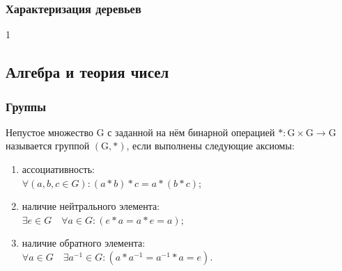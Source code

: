 \documentclass[12pt]{matmex-diploma}
\begin{document}
        \subsubsection*{Характеризация деревьев}      
            1
        
    \subsection{Алгебра и теория чисел}
        
        \subsubsection*{Группы}
            Непустое множество G с заданной на нём бинарной операцией $*:\mathrm{G} \times \mathrm{G} \rightarrow \mathrm{G}$ называется группой $(\mathrm {G} ,*)$, если выполнены следующие аксиомы:
            \begin{enumerate}
                \item ассоциативность: \\$\forall (a,b,c\in G)\colon (a*b)*c=a*(b*c)$;
                \item наличие нейтрального элемента: \\$\exists e\in G\quad \forall a\in G\colon (e*a=a*e=a)$;
                \item наличие обратного элемента: \\$\forall a\in G\quad \exists a^{-1}\in G\colon (a*a^{-1}=a^{-1}*a=e)$.
            \end{enumerate}
            
\end{document}
